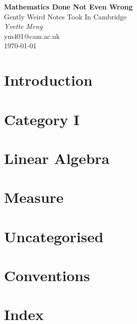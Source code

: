 \documentclass[11pt,a4paper]{article}
\begin{document}
\pagestyle{plain}

\begin{center}                  
\vspace{5cm} 

{\LARGE \textbf{Mathematics Done Not Even Wrong}}\\
\vspace{5cm}
{\large Gently Weird Notes Took In Cambridge}\\
\vspace{5cm}
{\Large \textit{Yvette Meng}}\\
\vspace{1cm}
{\large ym401@cam.ac.uk}\\
\vspace{1cm}
{\large \today}
\end{center}
\newpage

\tableofcontents
\newpage

\section{Introduction}

\newpage

\section{Category I}

\newpage

\section{Linear Algebra}

\newpage

\section{Measure}

\newpage

\section{Uncategorised}

\newpage

\appendix
\section{Conventions}

\newpage

\section{Index}

\end{document}
